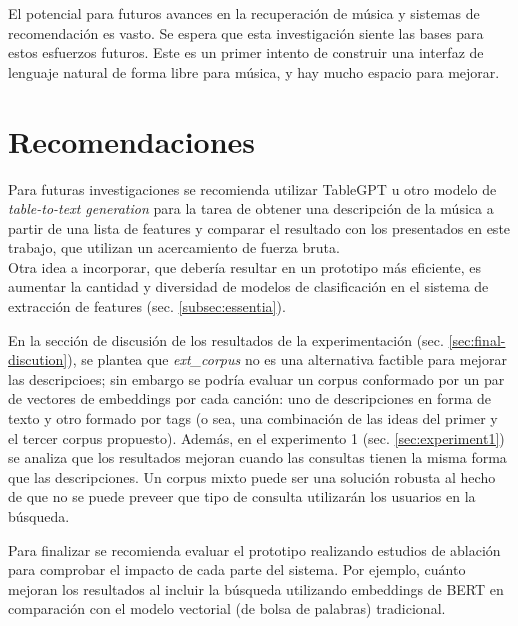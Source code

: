 El potencial para futuros avances en la recuperación de música y sistemas de recomendación es vasto. Se espera que esta investigación siente las bases para estos esfuerzos futuros. Este es un primer intento de construir una interfaz de lenguaje natural de forma libre para música, y hay mucho espacio para mejorar.

\chapter*{Recomendaciones}
\label{chap:recommendations}

Para futuras investigaciones se recomienda utilizar TableGPT \cite{Gong2020TableGPTFT} u otro modelo de \textit{table-to-text generation} para la tarea de obtener una descripción de la música a partir de una lista de features y comparar el resultado con los presentados en este trabajo, que utilizan un acercamiento de fuerza bruta. \\
Otra idea a incorporar, que debería resultar en un prototipo más eficiente, es aumentar la cantidad y diversidad de modelos de clasificación en el sistema de extracción de features (sec. \ref{subsec:essentia}).

En la sección de discusión de los resultados de la experimentación (sec. \ref{sec:final-discution}), se plantea que \textit{ext\_corpus} no es una alternativa factible para mejorar las descripcioes; sin embargo se podría evaluar un corpus conformado por un par de vectores de embeddings por cada canción: uno de descripciones en forma de texto y otro formado por tags (o sea, una combinación de las ideas del primer y el tercer corpus propuesto). Además, en el experimento 1 (sec. \ref{sec:experiment1}) se analiza que los resultados mejoran cuando las consultas tienen la misma forma que las descripciones. Un corpus mixto puede ser una solución robusta al hecho de que no se puede preveer que tipo de consulta utilizarán los usuarios en la búsqueda.

Para finalizar se recomienda evaluar el prototipo realizando estudios de ablación para comprobar el impacto de cada parte del sistema. Por ejemplo, cuánto mejoran los resultados al incluir la búsqueda utilizando embeddings de BERT en comparación con el modelo vectorial (de bolsa de palabras) tradicional.
